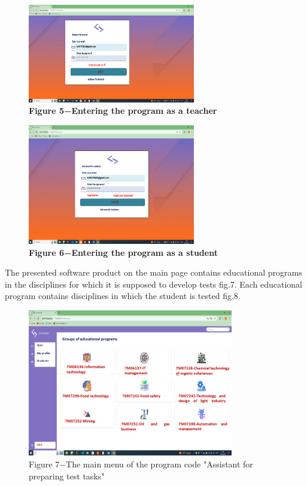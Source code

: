 \begin{figure}[H]
	\centering
	\includegraphics[height=0.35\textwidth, width=0.65\textwidth]{assets/130}
	\caption*{\bfseries Figure 5−Entering the program as a teacher}
\end{figure}


\begin{figure}[H]
	\centering
	\includegraphics[height=0.35\textwidth, width=0.65\textwidth]{assets/131}
	\caption*{\bfseries Figure 6−Entering the program as a student}
\end{figure}

\begin{multicols}{2}
The presented software product on the main page contains educational
programs in the disciplines for which it is supposed to develop tests fig.7.
Each educational program contains disciplines in which the student is tested fig.8.
\end{multicols}



\begin{figure}[H]
	\centering
	\includegraphics[height=0.4\textwidth, width=0.8\textwidth]{assets/132}
	\caption*{Figure 7−The main menu of the program code "Assistant for
	preparing test tasks"}
\end{figure}



